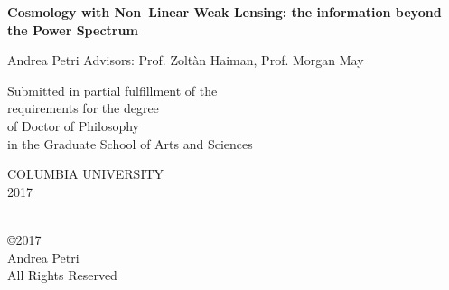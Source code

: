 \documentclass[12pt,twoside,authordate1-4]{book}      %
\begin{document}

%






\thispagestyle{empty}


\def\thesistitle{Cosmology with Non--Linear Weak Lensing: the information beyond the Power Spectrum}


\pagestyle{empty}

\begin{center}

{\Large \bf \thesistitle}

\vskip1.5in

{\Large  Andrea Petri } %
\vskip0.5in
{\Large  Advisors: Prof. Zolt\`an Haiman, Prof. Morgan May} 



\vskip1.1in


\large
Submitted in partial fulfillment of the               \\
requirements for the degree                           \\
of Doctor of Philosophy                               \\
in the Graduate School of Arts and Sciences           \\

\vskip0.5in

COLUMBIA UNIVERSITY                                   \\
2017                                                  \\

\end{center}


\clearpage


\begin{center}
\ \\
\vskip5.5in
\copyright 2017 \\[3mm]
Andrea Petri\\
All Rights Reserved
\end{center}
\clearpage


\end{document}
